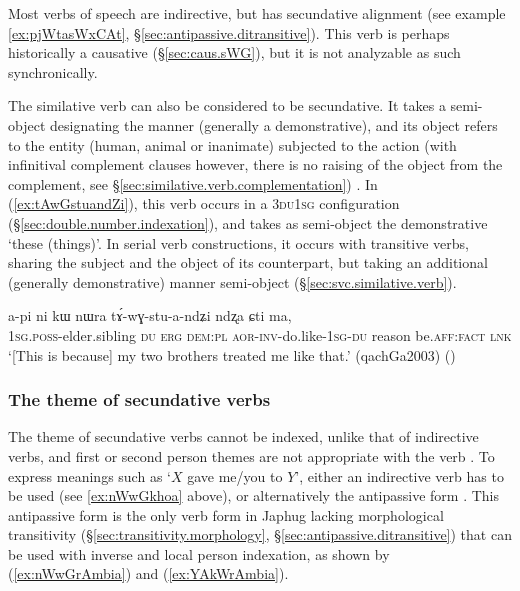 Most verbs of speech are indirective, but  has secundative alignment (see example \ref{ex:pjWtasWxCAt}, §\ref{sec:antipassive.ditransitive}). This verb is perhaps historically a causative (§\ref{sec:caus.sWG}), but it is not analyzable as such synchronically. 

The similative verb  can also be considered to be secundative. It takes a semi-object designating the manner (generally a demonstrative), and its object refers to the entity (human, animal or inanimate) subjected to the action (with infinitival complement clauses however, there is no raising of the object from the complement, see §\ref{sec:similative.verb.complementation}) . In (\ref{ex:tAwGstuandZi}), this verb occurs in a \textsc{3du}\fl{}\textsc{1sg} configuration (§\ref{sec:double.number.indexation}), and takes as semi-object the demonstrative  `these (things)'. In serial verb constructions, it occurs with transitive verbs, sharing the subject and the object of its counterpart, but taking an additional (generally demonstrative) manner semi-object (§\ref{sec:svc.similative.verb}). 

\begin{exe}
	\ex \label{ex:tAwGstuandZi}
	\gll   a-pi ni kɯ nɯra tɤ́-wɣ-stu-a-ndʑi ndʐa ɕti ma, \\
	\textsc{1sg}.\textsc{poss}-elder.sibling \textsc{du} \textsc{erg} \textsc{dem}:\textsc{pl} \textsc{aor}-\textsc{inv}-do.like-\textsc{1sg}-\textsc{du} reason be.\textsc{aff}:\textsc{fact} \textsc{lnk} \\
	\glt `[This is because] my two brothers treated me like that.' (qachGa2003)
()
\end{exe}


\subsubsection{The theme of secundative verbs} \label{sec:secundative.theme}
The theme of secundative verbs cannot be indexed, unlike that of indirective verbs, and first or second person themes are not appropriate with the verb . To express meanings such as `$X$ gave me/you to $Y$', either an indirective verb has to be used (see \ref{ex:nWwGkhoa} above), or alternatively the antipassive form . This antipassive form is the only verb form in Japhug lacking morphological transitivity (§\ref{sec:transitivity.morphology}, §\ref{sec:antipassive.ditransitive}) that can be used with inverse  and local person indexation, as shown by (\ref{ex:nWwGrAmbia}) and (\ref{ex:YAkWrAmbia}).

